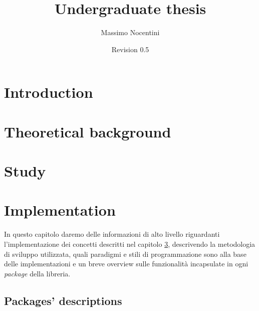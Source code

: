 \documentclass[8pt, a4paper]{report}
\title{Undergraduate thesis}
\author{Massimo Nocentini}
\date{Revision 0.5}
\begin{document}
\lstset{
	language = java
	, numbers = left 
	, basicstyle=\sffamily%
	, tabsize=2
	, captionpos=b
	, breaklines=true
	, showspaces=false
	, showstringspaces=false
}

\maketitle

\tableofcontents

\newpage


\newpage


\newpage


\chapter{Introduction}



\chapter{Theoretical background}
\label{chapter:theoretical-background}


\chapter{Study}
\label{chapter:study}




\chapter{Implementation}

In questo capitolo daremo delle informazioni di alto livello
riguardanti l'implementazione dei concetti descritti nel capitolo
\ref{chapter:study}, descrivendo la metodologia di sviluppo
utilizzata, quali paradigmi e stili di programmazione sono alla base
delle implementazioni e un breve overview sulle funzionalit\`a
incapsulate in ogni \emph{package} della libreria.





\newpage
\section*{Packages' descriptions}
\end{document}
